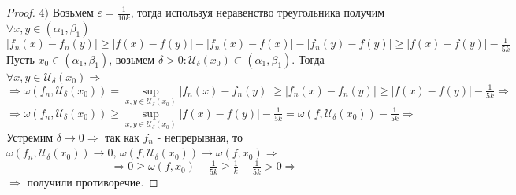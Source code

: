 \documentclass[12pt]{article}
\newcommand{\MU}{\mathcal{U}}
\newcommand{\VE}{\varepsilon}
\theoremstyle{definition}
\begin{document}
\begin{proof}
	$4)$ Возьмем $\VE = \frac{1}{10k}$, тогда используя неравенство треугольника получим $\forall x,y \in (\alpha_1,\beta_1)$
	$$|f_n(x) - f_n(y)| \geq |f(x) - f(y)| - |f_n(x) - f(x)| - |f_n(y) - f(y)| \geq |f(x) - f(y)| - \tfrac{1}{5k}$$ 
	Пусть $x_0 \in (\alpha_1, \beta_1)$, возьмем $\delta > 0 \colon \MU_\delta(x_0) \subset (\alpha_1,\beta_1)$. Тогда $\forall x,y \in \MU_\delta(x_0) \Rightarrow$ $$\Rightarrow \omega(f_n,\MU_\delta(x_0)) = \sup\limits_{x,y \in \MU_\delta(x_0)}|f_n(x) - f_n(y)| \geq |f_n(x) - f_n(y)| \geq|f(x) - f(y)| - \tfrac{1}{5k} \Rightarrow$$ 
	$$\Rightarrow \omega(f_n,\MU_\delta(x_0)) \geq \sup\limits_{x,y \in \MU_\delta(x_0)}|f(x) - f(y)| - \tfrac{1}{5k} = \omega(f,\MU_\delta(x_0)) - \tfrac{1}{5k}\Rightarrow$$
	Устремим $\delta \to 0 \Rightarrow$ так как $f_n$ - непрерывная, то  $\omega(f_n,\MU_\delta(x_0)) \to 0, \, \omega(f,\MU_\delta(x_0)) \to \omega(f,x_0) \Rightarrow$  
	$$\Rightarrow 0 \geq \omega(f,x_0) - \tfrac{1}{5k} \geq \tfrac{1}{k} - \tfrac{1}{5k} > 0 \Rightarrow$$ 
	$\Rightarrow$ получили противоречие.
\end{proof}
\end{document}
